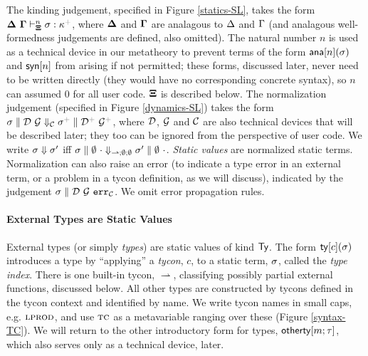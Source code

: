 \documentclass[9pt,preprint]{sigplanconf}
\newcommand{\moutput}{^{\color{gray}{+}}}
\begin{document}
The kinding judgement, specified  in Figure \ref{statics-SL}, takes the form $\sofkX{\st}{\kappa\moutput}$, where $\boldsymbol\Delta$ and $\boldsymbol\Gamma$ are analagous to $\Delta$ and $\Gamma$ (and analagous well-formedness judgements are defined, also omitted). The natural number $n$ is used as a technical device in our metatheory to prevent terms of the form ${\sf ana}[n](\sigma)$ and ${\sf syn}[n]$ from arising if not permitted; these forms, discussed later, never need to be written directly (they would have no corresponding concrete syntax), so $n$ can assumed 0 for all user code. $\boldsymbol\Xi$ is described below. The normalization judgement (specified in Figure \ref{dynamics-SL}) takes the form $\snorm{\st}{\memD}{\memG}{\aCtx}{\st\moutput}{\memD\moutput}{\memG\moutput}$, where $\mathcal{D}$, $\mathcal{G}$ and $\mathcal{C}$ are also technical devices that will be described later; they too can be ignored from the perspective of user code. We write $\sigma \Downarrow \sigma'$ iff $\sigma \parallel \emptyset~\cdot \Downarrow_{{\rightharpoonup}; \emptyset; \emptyset} \sigma' \parallel \emptyset~\cdot$. \emph{Static values} are normalized static terms. Normalization can also raise an error (to indicate a type error in an external term, or a problem in a tycon definition, as we will discuss), indicated by the judgement $\sigma \parallel \mathcal{D}~\mathcal{G}~\mathtt{err}_{\mathcal{C}}$. We omit error propagation rules.%


\paragraph{External Types are Static Values}

External types (or simply \emph{types}) are {static values} of kind ${\sf Ty}$.  %
The form ${\sf ty}[c](\sigma)$ introduces a type by ``applying'' a \emph{tycon}, $c$, to a static term, $\sigma$, called the \emph{type index}. There is one built-in tycon, $\rightharpoonup$, classifying possibly partial external functions, discussed below. All other types are constructed by tycons defined in the tycon context and identified by name. We write tycon names in small caps, e.g. $\textsc{lprod}$, and use $\textsc{tc}$ as a metavariable ranging over these (Figure \ref{syntax-TC}). We will return to the other introductory form for types, ${\sf otherty}[m; \tau]$, which also serves only as a technical device, later. %
\end{document}
